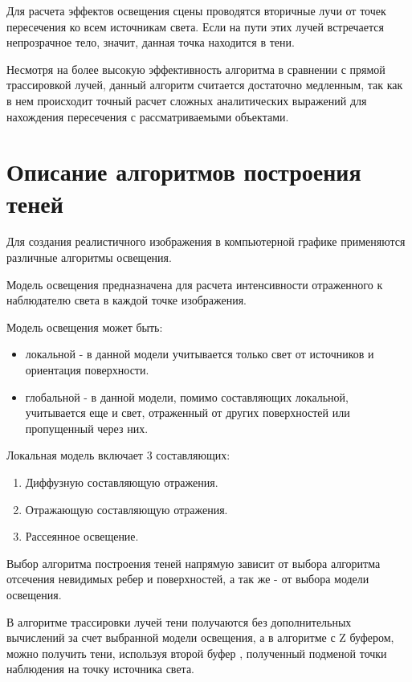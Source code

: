             Для расчета эффектов освещения сцены проводятся вторичные лучи от точек пересечения ко всем источникам света. Если на пути этих лучей встречается непрозрачное тело, значит, данная точка находится в тени.
            
            Несмотря на более высокую эффективность алгоритма в сравнении с прямой трассировкой лучей, данный алгоритм считается достаточно медленным, так как в нем происходит точный расчет сложных аналитических выражений для нахождения пересечения с рассматриваемыми объектами.
        
    \section{Описание алгоритмов построения теней}
        
        Для создания реалистичного изображения в компьютерной графике применяются различные алгоритмы освещения.
        
        Модель освещения предназначена для расчета интенсивности отраженного к наблюдателю света в каждой точке изображения.
        
        Модель освещения может быть:
        \begin{itemize}
            \item локальной - в данной модели учитывается только свет от источников и ориентация поверхности.
            \item глобальной - в данной модели, помимо составляющих локальной, учитывается еще и свет, отраженный от других поверхностей или пропущенный через них.
        \end{itemize}
        
        Локальная модель включает 3 составляющих:
        \begin{enumerate}
        	\item Диффузную составляющую отражения.
        	\item Отражающую составляющую отражения.
        	\item Рассеянное освещение.
        \end{enumerate}
        
        Выбор алгоритма построения теней напрямую зависит от выбора алгоритма отсечения невидимых ребер и поверхностей, а так же - от выбора модели освещения. 
        
        В алгоритме трассировки лучей тени получаются без дополнительных вычислений за счет выбранной модели освещения, а в алгоритме с Z буфером, можно получить тени, используя второй буфер \cite{shykin}, полученный подменой точки наблюдения на точку источника света. 
        
